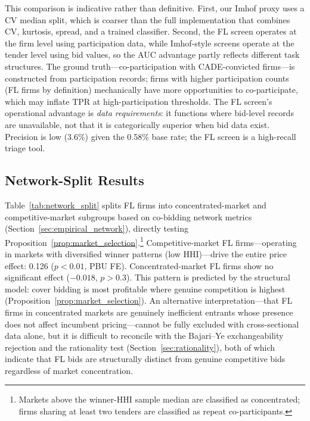 This comparison is indicative rather than definitive. First, our
Imhof proxy uses a CV median split, which is coarser than the full
\citet{imhof2019detecting} implementation that combines CV, kurtosis,
spread, and a trained classifier. Second, the FL screen
operates at the firm level using participation data, while
Imhof-style screens operate at the tender level using bid values, so
the AUC advantage partly reflects different task structures. The
ground truth---co-participation with CADE-convicted firms---is
constructed from participation records; firms with higher
participation counts (FL firms by definition) mechanically have more
opportunities to co-participate, which may inflate TPR at
high-participation thresholds. The FL screen's operational advantage
is \emph{data requirements}: it functions where bid-level records are
unavailable, not that it is categorically superior when bid data
exist. Precision is low (3.6\%) given the 0.58\% base rate; the FL
screen is a high-recall triage tool.




\subsection{Network-Split Results}
\label{sec:results_network}

Table~\ref{tab:network_split} splits FL firms into
concentrated-market and competitive-market subgroups based on
co-bidding network metrics (Section~\ref{sec:empirical_network}),
directly testing Proposition~\ref{prop:market_selection}.\footnote{Markets
above the winner-HHI sample median are classified as concentrated;
firms sharing at least two tenders are classified as repeat
co-participants.}
Competitive-market FL firms---operating in markets with diversified
winner patterns (low HHI)---drive the entire price effect: 0.126
($p < 0.01$, PBU FE). Concentrated-market FL firms show no significant
effect ($-0.018$, $p > 0.3$). This pattern is predicted by the structural model: cover bidding is most
profitable where genuine competition is highest
(Proposition~\ref{prop:market_selection}). An alternative
interpretation---that FL firms in concentrated markets are genuinely
inefficient entrants whose presence does not affect incumbent
pricing---cannot be fully excluded with cross-sectional data alone,
but it is difficult to reconcile with the Bajari--Ye exchangeability
rejection and the rationality test (Section~\ref{sec:rationality}),
both of which indicate that FL bids are structurally distinct from
genuine competitive bids regardless of market concentration.

